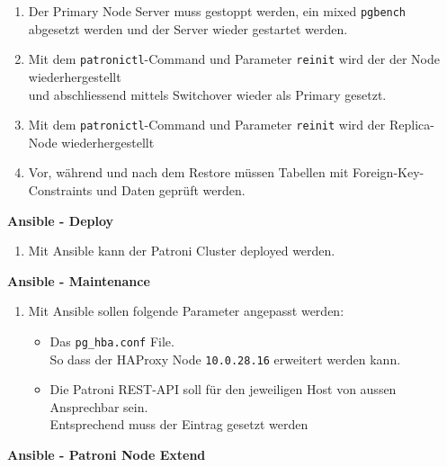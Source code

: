\begin{flushleft}
\begin{description}
        \begin{enumerate}[resume]
            \item Der Primary Node Server muss gestoppt werden, ein mixed \texttt{pgbench} abgesetzt werden und der Server wieder gestartet werden.
            \item Mit dem \texttt{patronictl}-Command und Parameter \texttt{reinit} wird der der Node wiederhergestellt\\und abschliessend mittels Switchover wieder als Primary gesetzt.
            \item Mit dem \texttt{patronictl}-Command und Parameter \texttt{reinit} wird der Replica-Node wiederhergestellt
            \item Vor, während und nach dem Restore müssen Tabellen mit Foreign-Key-Constraints und Daten geprüft werden.
        \end{enumerate}
        \item \textbf{Ansible - Deploy}\hfill \\
        \begin{enumerate}[resume]
            \item Mit \Gls{Ansible} kann der Patroni Cluster deployed werden.
        \end{enumerate}
        \item \textbf{Ansible - Maintenance}\hfill \\
        \begin{enumerate}[resume]
            \item Mit \Gls{Ansible} sollen folgende Parameter angepasst werden:
            \begin{itemize}
                \item Das \texttt{pg\_hba.conf} File.\\So dass der \Gls{HAProxy} Node \texttt{10.0.28.16} erweitert werden kann.
                \item Die Patroni REST-API soll für den jeweiligen Host von aussen Ansprechbar sein.\\Entsprechend muss der Eintrag gesetzt werden
            \end{itemize}
        \end{enumerate}
        \item \textbf{Ansible - Patroni Node Extend}\hfill \\
        \begin{enumerate}[resume]

\end{enumerate}
\end{description}
\end{flushleft}
